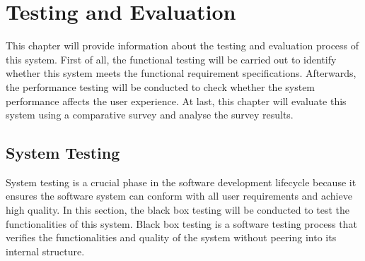 
\chapter{Testing and Evaluation} \label{Chapter:Testing and Evaluation}

This chapter will provide information about the testing and evaluation process of this system. First of all, the functional testing will be carried out to identify whether this system meets the functional requirement specifications. Afterwards, the performance testing will be conducted to check whether the system performance affects the user experience. At last, this chapter will evaluate this system using a comparative survey and analyse the survey results.



\section{System Testing}

System testing is a crucial phase in the software development lifecycle because it ensures the software system can conform with all user requirements and achieve high quality. In this section, the black box testing will be conducted to test the functionalities of this system. Black box testing is a software testing process that verifies the functionalities and quality of the system without peering into its internal structure. 

